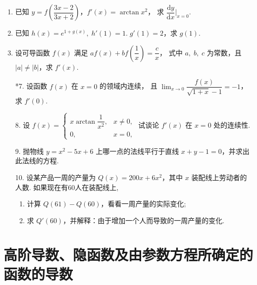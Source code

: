 \begin{enumerate}
    \item 已知 $y=f\left(\dfrac{3x-2}{3x+2}\right)$，$f'(x)=\arctan x^2$，
    求 $\dfrac{\text{d}y}{\text{d}x}\bigg|_{x=0}$.
    
    \item 已知 $h(x)=e^{1+g(x)},\;h'(1)=1.\;g'(1)=2$，求 $g(1)$.
    
    \item 设可导函数 $f(x)$ 满足 $af(x)+bf\left(\dfrac{1}{x}\right)=\dfrac{c}{x}$，
    式中 $a,\;b,\;c$ 为常数，且 $|a|\not=|b|$，求 $f'(x)$.

    \item[*7.] 设函数 $f(x)$ 在 $x=0$ 的领域内连续，
    且 $\displaystyle\lim_{x\to0}\dfrac{f(x)}{\sqrt{1+x}-1}=-1$，求 $f'(0)$. 

    \item[8.] 设 $f(x)=\begin{cases}
        x\arctan\dfrac{1}{x^2},&x\not=0,\\
        0,&x=0,
    \end{cases}$ 试谈论 $f'(x)$ 在 $x=0$ 处的连续性.

    \item[9.] 抛物线 $y=x^2-5x+6$ 上哪一点的法线平行于直线 $x+y-1=0$，并求出此法线的方程.
    
    \item[10.] 设某产品一周的产量为 $Q(x)=200x+6x^2$，其中 $x$ 装配线上劳动者的人数. 如果现在有60人在装配线上,
    \begin{enumerate}[(1)]\setlength{\itemsep}{5pt}\setlength{\topsep}{15pt}
        \item 计算 $Q(61)-Q(60)$，看看一周产量的实际变化;
        \item 求 $Q'(60)$，并解释：由于增加一个人而导致的一周产量的变化.
    \end{enumerate}

\end{enumerate}

\section{高阶导数、隐函数及由参数方程所确定的函数的导数}

